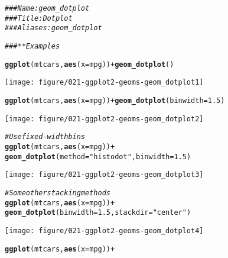 \documentclass[a4paper,titlepage]{tufte-handout}\usepackage[]{graphicx}\usepackage[]{color}
\makeatletter
\def\maxwidth{ %
  \ifdim\Gin@nat@width>\linewidth
    \linewidth
  \else
    \Gin@nat@width
  \fi
}
\newcommand{\hlnum}[1]{\textcolor[rgb]{0.686,0.059,0.569}{#1}}%
\newcommand{\hlstr}[1]{\textcolor[rgb]{0.192,0.494,0.8}{#1}}%
\newcommand{\hlcom}[1]{\textcolor[rgb]{0.678,0.584,0.686}{\textit{#1}}}%
\newcommand{\hlopt}[1]{\textcolor[rgb]{0,0,0}{#1}}%
\newcommand{\hlstd}[1]{\textcolor[rgb]{0.345,0.345,0.345}{#1}}%
\newcommand{\hlkwc}[1]{\textcolor[rgb]{0.333,0.667,0.333}{#1}}%
\newcommand{\hlkwd}[1]{\textcolor[rgb]{0.737,0.353,0.396}{\textbf{#1}}}%
\newenvironment{kframe}{%
 \def\at@end@of@kframe{}%
 \ifinner\ifhmode%
  \def\at@end@of@kframe{\end{minipage}}%
  \begin{minipage}{\columnwidth}%
 \fi\fi%
 \def\FrameCommand##1{\hskip\@totalleftmargin \hskip-\fboxsep
 \colorbox{shadecolor}{##1}\hskip-\fboxsep
     \hskip-\linewidth \hskip-\@totalleftmargin \hskip\columnwidth}%
 \MakeFramed {\advance\hsize-\width
   \@totalleftmargin\z@ \linewidth\hsize
   \@setminipage}}%
 {\par\unskip\endMakeFramed%
 \at@end@of@kframe}
\newenvironment{knitrout}{}{} %
\makeatother
\begin{document}
\begin{knitrout}
\color{fgcolor}\begin{kframe}
\begin{alltt}
\hlcom{### Name: geom_dotplot}
\hlcom{### Title: Dot plot}
\hlcom{### Aliases: geom_dotplot}

\hlcom{### ** Examples}

\hlkwd{ggplot}\hlstd{(mtcars,} \hlkwd{aes}\hlstd{(}\hlkwc{x} \hlstd{= mpg))} \hlopt{+} \hlkwd{geom_dotplot}\hlstd{()}
\end{alltt}


{\ttfamily\noindent\itshape\color{messagecolor}{\#\# stat\_bindot: binwidth defaulted to range/30. Use 'binwidth = x' to adjust this.}}\end{kframe}
\texttt{[image: figure/021-ggplot2-geoms-geom\_dotplot1]} 
\begin{kframe}\begin{alltt}
\hlkwd{ggplot}\hlstd{(mtcars,} \hlkwd{aes}\hlstd{(}\hlkwc{x} \hlstd{= mpg))} \hlopt{+} \hlkwd{geom_dotplot}\hlstd{(}\hlkwc{binwidth} \hlstd{=} \hlnum{1.5}\hlstd{)}
\end{alltt}
\end{kframe}
\texttt{[image: figure/021-ggplot2-geoms-geom\_dotplot2]} 
\begin{kframe}\begin{alltt}
\hlcom{# Use fixed-width bins}
\hlkwd{ggplot}\hlstd{(mtcars,} \hlkwd{aes}\hlstd{(}\hlkwc{x} \hlstd{= mpg))} \hlopt{+}
  \hlkwd{geom_dotplot}\hlstd{(}\hlkwc{method}\hlstd{=}\hlstr{"histodot"}\hlstd{,} \hlkwc{binwidth} \hlstd{=} \hlnum{1.5}\hlstd{)}
\end{alltt}
\end{kframe}
\texttt{[image: figure/021-ggplot2-geoms-geom\_dotplot3]} 
\begin{kframe}\begin{alltt}
\hlcom{# Some other stacking methods}
\hlkwd{ggplot}\hlstd{(mtcars,} \hlkwd{aes}\hlstd{(}\hlkwc{x} \hlstd{= mpg))} \hlopt{+}
  \hlkwd{geom_dotplot}\hlstd{(}\hlkwc{binwidth} \hlstd{=} \hlnum{1.5}\hlstd{,} \hlkwc{stackdir} \hlstd{=} \hlstr{"center"}\hlstd{)}
\end{alltt}
\end{kframe}
\texttt{[image: figure/021-ggplot2-geoms-geom\_dotplot4]} 
\begin{kframe}\begin{alltt}
\hlkwd{ggplot}\hlstd{(mtcars,} \hlkwd{aes}\hlstd{(}\hlkwc{x} \hlstd{= mpg))} \hlopt{+}

\end{alltt}
\end{kframe}
\end{knitrout}
\end{document}
